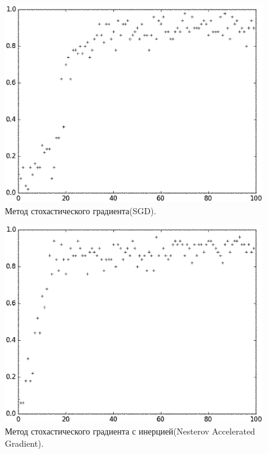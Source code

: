 \documentclass[oneside,final,14pt]{extreport}
\begin{document}
\begin{figure}[!hb]
    \centering
    \includegraphics[width=1.0\textwidth]{SGD.eps}
    \caption{Метод стохастического градиента(SGD).}
    \label{fig:SGD}
\end{figure}
 
\begin{figure}
    \centering
    \includegraphics[width=1.0\textwidth]{Nesterov.eps}
    \caption{Метод стохастического градиента с инерцией(Nesterov Accelerated Gradient).}
    \label{fig:Nesterov}
\end{figure}
\end{document}
